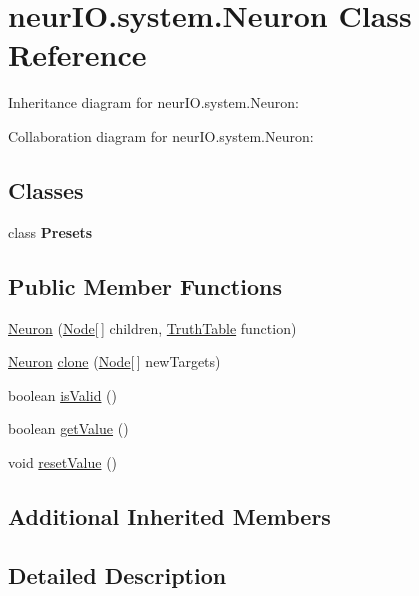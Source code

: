 \hypertarget{classneur_i_o_1_1system_1_1_neuron}{}\section{neur\+I\+O.\+system.\+Neuron Class Reference}
\label{classneur_i_o_1_1system_1_1_neuron}


Inheritance diagram for neur\+I\+O.\+system.\+Neuron\+:


Collaboration diagram for neur\+I\+O.\+system.\+Neuron\+:
\subsection*{Classes}
\begin{DoxyCompactItemize}
\item 
class {\bfseries Presets}
\end{DoxyCompactItemize}
\subsection*{Public Member Functions}
\begin{DoxyCompactItemize}
\item 
\hyperlink{classneur_i_o_1_1system_1_1_neuron_af05fb9eac54b8f73ed831b3f1fd1f665}{Neuron} (\hyperlink{classneur_i_o_1_1system_1_1_node}{Node}\mbox{[}$\,$\mbox{]} children, \hyperlink{classneur_i_o_1_1system_1_1_truth_table}{Truth\+Table} function)
\item 
\hyperlink{classneur_i_o_1_1system_1_1_neuron}{Neuron} \hyperlink{classneur_i_o_1_1system_1_1_neuron_afdfb793400c4507d3d94d07595e5f3f6}{clone} (\hyperlink{classneur_i_o_1_1system_1_1_node}{Node}\mbox{[}$\,$\mbox{]} new\+Targets)
\item 
boolean \hyperlink{classneur_i_o_1_1system_1_1_neuron_aa1ff6529c3a04fc5ecdaf41dd8a143cb}{is\+Valid} ()
\item 
boolean \hyperlink{classneur_i_o_1_1system_1_1_neuron_a7e2bfa3a562b6a26e3844d3285cbb669}{get\+Value} ()
\item 
void \hyperlink{classneur_i_o_1_1system_1_1_neuron_a0adab143f0cbca556908f06d28cde838}{reset\+Value} ()
\end{DoxyCompactItemize}
\subsection*{Additional Inherited Members}


\subsection{Detailed Description}
